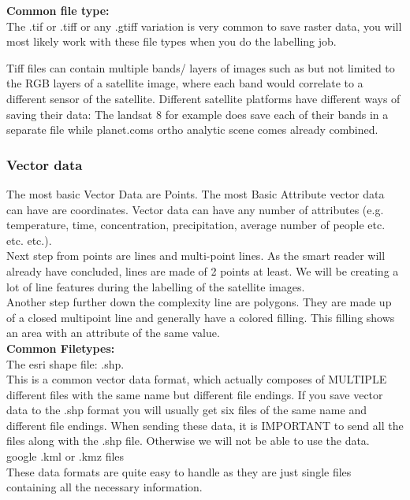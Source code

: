 \documentclass[12pt,a4paper]{scrartcl}
\begin{document}
\textbf{Common file type:} \\

The .tif or .tiff or any .gtiff variation is very common to save raster data, you will most likely work with these file types when you do the labelling job.  

Tiff files can contain multiple bands/ layers of images such as but not limited to the RGB layers of a satellite image,
where each band would correlate to a different sensor of the satellite.
Different satellite platforms have different ways of saving their data: 
The landsat 8 for example does save each of their bands in a separate file while planet.coms ortho analytic scene comes already combined. 

\subsubsection{Vector data}

The most basic Vector Data are Points. The most Basic Attribute vector data can have are coordinates. 
Vector data can have any number of attributes (e.g. temperature, time, concentration, precipitation, average number of people etc. etc. etc.). \\

Next step from points are lines and multi-point lines.
As the smart reader will already have concluded, lines are made of 2 points at least.
We will be creating a lot of line features during the labelling of the satellite images.\\

Another step further down the complexity line are polygons. 
They are made up of a closed multipoint line and generally have a colored filling.
This filling shows an area with an attribute of the same value. \\

\textbf{Common Filetypes:}\\

The esri shape file: .shp. \\
This is a common vector data format, which actually composes of MULTIPLE different files with the same name but different file endings.
If you save vector data to the .shp format you will usually get six files of the same name and different file endings.
When sending these data, it is IMPORTANT to send all the files along with the .shp file. 
Otherwise we will not be able to use the data.\\

google .kml or .kmz files \\
These data formats are quite easy to handle as they are just single files containing all the necessary information.
\end{document}
